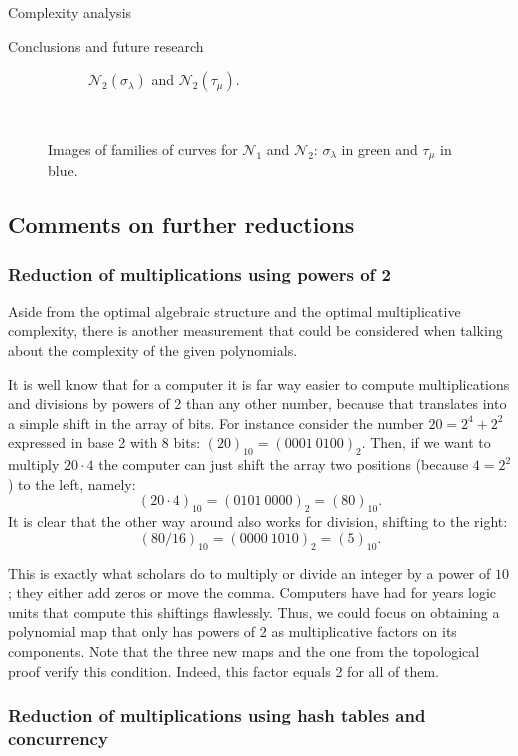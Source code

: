 \documentclass[11pt, a4paper, english, twoside, notitlepage, openright]{report}
\begin{document}
\begin{chapter}{Complexity analysis}
\begin{section}{Conclusions and future research}
\begin{figure}
\begin{subfigure}{.45\linewidth}
\vspace{-0.4cm}\caption{$\mathcal{N}_2(\sigma_{\lambda})$ and $\mathcal{N}_2(\tau_{\mu})$.\label{fig:5curves1}}
\end{subfigure}\\[1ex]
\vspace{-0.2cm}

\vspace{-0.1cm}\caption{Images of families of curves for $\mathcal{N}_1$ and $\mathcal{N}_2$: $\sigma_{\lambda}$ in green and $\tau_{\mu}$ in blue.\label{fig:curvesfg}}
\end{figure}

\subsection{Comments on further reductions}

\subsubsection{Reduction of multiplications using powers of 2}

Aside from the optimal algebraic structure and the optimal multiplicative complexity, there is another measurement that could be considered when talking about the complexity of the given polynomials.

It is well know that for a computer it is far way easier to compute multiplications and divisions by powers of 2 than any other number, because that translates into a simple shift in the array of bits. For instance consider the number $20 = 2^4 + 2^2$ expressed in base 2 with 8 bits: $(20)_{10} = (0001\ 0100)_2$. Then, if we want to multiply $20\cdot 4$ the computer can just shift the array two positions (because $4=2^2$) to the left, namely:
$$(20 \cdot 4)_{10} = (0101\ 0000)_2 = (80)_{10}.$$
It is clear that the other way around also works for division, shifting to the right:
$$(80 / 16)_{10} = (0000\ 1010)_2 = (5)_{10}.$$

This is exactly what scholars do to multiply or divide an integer by a power of $10$; they either add zeros or move the  comma. Computers have had for years logic units that compute this shiftings flawlessly. Thus, we could focus on obtaining a polynomial map that only has powers of 2 as multiplicative factors on its components. Note that the three new maps and the one from the topological proof verify this condition. Indeed, this factor equals 2 for all of them.

\subsubsection{Reduction of multiplications using hash tables and concurrency}


\end{section}
\end{chapter}
\end{document}
